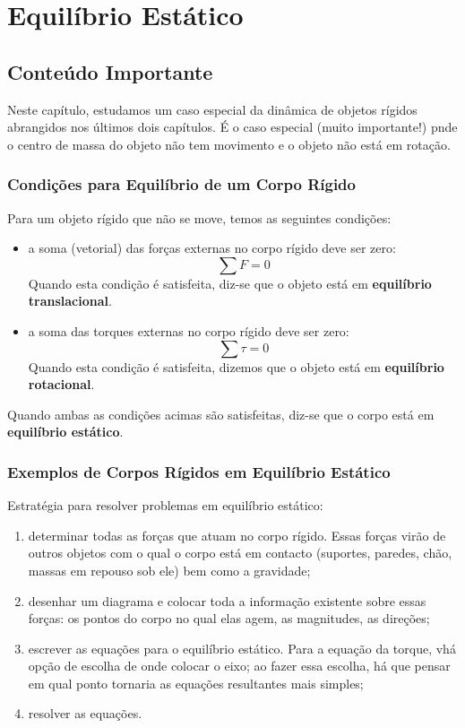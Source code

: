 \section{Equilíbrio Estático}
\subsection{Conteúdo Importante}

Neste capítulo, estudamos um caso especial da dinâmica de objetos rígidos abrangidos nos últimos dois capítulos. É o caso especial (muito importante!) pnde o centro de massa do objeto não tem movimento e o objeto não está em rotação.

\subsubsection{Condições para Equilíbrio de um Corpo Rígido}
Para um objeto rígido que não se move, temos as seguintes condições:

\begin{itemize}
    \item a soma (vetorial) das forças externas no corpo rígido deve ser zero:
    \begin{equation}
        \sum F =0
    \end{equation}
    Quando esta condição é satisfeita, diz-se que o objeto está em \textbf{equilíbrio translacional}.
    \item a soma das torques externas no corpo rígido deve ser zero:
    \begin{equation}
        \sum \tau = 0
    \end{equation}
    Quando esta condição é satisfeita, dizemos que o objeto está em \textbf{equilíbrio rotacional}.
\end{itemize}

Quando ambas as condições acimas são satisfeitas, diz-se que o corpo está em \textbf{equilíbrio estático}.

\subsubsection{Exemplos de Corpos Rígidos em Equilíbrio Estático}
Estratégia para resolver problemas em equilíbrio estático:
\begin{enumerate}
    \item determinar todas as forças que atuam no corpo rígido. Essas forças virão de outros objetos com o qual o corpo está em contacto (suportes, paredes, chão, massas em repouso sob ele) bem como a gravidade;
    \item desenhar um diagrama e colocar toda a informação existente sobre essas forças: os pontos do corpo no qual elas agem, as magnitudes, as direções;
    \item escrever as equações para o equilíbrio estático. Para a equação da torque, vhá opção de escolha de onde colocar o eixo; ao fazer essa escolha, há que pensar em qual ponto tornaria as equações resultantes mais simples;
    \item resolver as equações.
\end{enumerate}